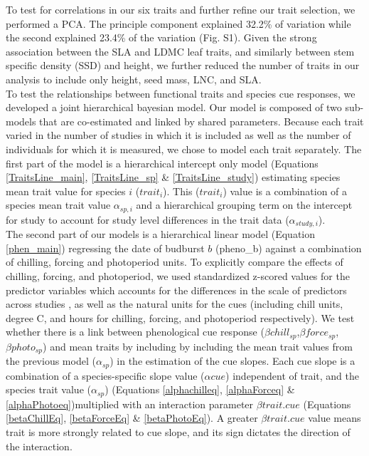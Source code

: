 \documentclass{article}\usepackage[]{graphicx}\usepackage[]{color}
\begin{document}
To test for correlations in our six traits and further refine our trait selection, we performed a PCA. The principle component explained 32.2\% of variation while the second explained 23.4\% of the variation (Fig. S1). Given the strong association between the SLA and LDMC leaf traits, and similarly between stem specific density (SSD) and height, we further reduced the number of traits in our analysis to include only height, seed mass, LNC, and SLA. \\

To test the relationships between functional traits and species cue responses, we developed a joint hierarchical bayesian model. Our model is composed of two sub-models that are co-estimated and linked by shared parameters. Because each trait varied in the number of studies in which it is included as well as the number of individuals for which it is measured, we chose to model each trait separately. The first part of the model is a hierarchical intercept only model (Equations \ref{TraitsLine_main}, \ref{TraitsLine_sp} & \ref{TraitsLine_study}) estimating species mean trait value for species $i$ ($trait_{i}$). This ($trait_{i}$) value is a combination of a species mean trait value $\alpha_{sp,i}$ and a hierarchical grouping term on the intercept for study to account for study level differences in the trait data ($\alpha_{study,i}$).  \\

The second part of our models is a hierarchical linear model (Equation \ref{phen_main}) regressing the date of budburst $b$ (pheno_{b}) against a combination of chilling, forcing and photoperiod units. To explicitly compare the effects of chilling, forcing, and photoperiod, we used standardized z-scored values for the predictor variables which accounts for the differences in the scale of predictors across studies \citep{Gelman2006}, as well as the natural units for the cues (including chill units, degree C, and hours for chilling, forcing, and photoperiod respectively). We test whether there is a link between phenological cue response ($\beta chill_{sp}$,$\beta force_{sp}$,$\beta photo_{sp}$) and mean traits by including by including the mean trait values from the previous model ($\alpha_{sp}$) in the estimation of the cue slopes. Each cue slope is a combination of a species-specific slope value ($\alpha cue$) independent of trait, and the species trait value ($\alpha_{sp}$) (Equations \ref{alphachilleq}, \ref{alphaForceq} & \ref{alphaPhotoeq})multiplied with an interaction parameter $\beta trait.cue$ (Equations \ref{betaChillEq}, \ref{betaForceEq} & \ref{betaPhotoEq}). A greater $\beta trait.cue$ value means trait is more strongly related to cue slope, and its sign dictates the direction of the interaction. 
\end{document}
